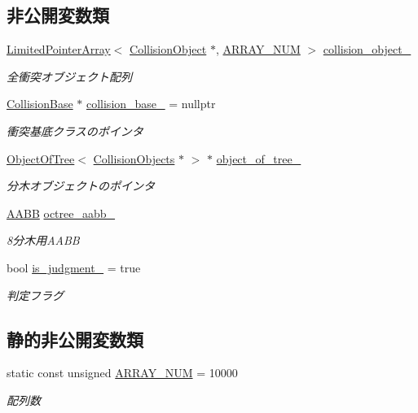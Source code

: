 \subsection*{非公開変数類}
\begin{DoxyCompactItemize}
\item 
\mbox{\hyperlink{class_limited_pointer_array}{Limited\+Pointer\+Array}}$<$ \mbox{\hyperlink{class_collision_object}{Collision\+Object}} $\ast$, \mbox{\hyperlink{class_collision_objects_a907cb151a9bbdd323eba56a4e4e1ee76}{A\+R\+R\+A\+Y\+\_\+\+N\+UM}} $>$ \mbox{\hyperlink{class_collision_objects_a35339b83828ab664fdcd51caca09cb79}{collision\+\_\+object\+\_\+}}
\begin{DoxyCompactList}\small\item\em 全衝突オブジェクト配列 \end{DoxyCompactList}\item 
\mbox{\hyperlink{class_collision_base}{Collision\+Base}} $\ast$ \mbox{\hyperlink{class_collision_objects_a03e2ef7152dac946f5bbf887d9e190b1}{collision\+\_\+base\+\_\+}} = nullptr
\begin{DoxyCompactList}\small\item\em 衝突基底クラスのポインタ \end{DoxyCompactList}\item 
\mbox{\hyperlink{class_object_of_tree}{Object\+Of\+Tree}}$<$ \mbox{\hyperlink{class_collision_objects}{Collision\+Objects}} $\ast$ $>$ $\ast$ \mbox{\hyperlink{class_collision_objects_a649c1aa07a6043611aa8f7394690250a}{object\+\_\+of\+\_\+tree\+\_\+}}
\begin{DoxyCompactList}\small\item\em 分木オブジェクトのポインタ \end{DoxyCompactList}\item 
\mbox{\hyperlink{class_a_a_b_b}{A\+A\+BB}} \mbox{\hyperlink{class_collision_objects_a611be393dff69dc143e729c4f3f37399}{octree\+\_\+aabb\+\_\+}}
\begin{DoxyCompactList}\small\item\em 8分木用\+A\+A\+BB \end{DoxyCompactList}\item 
bool \mbox{\hyperlink{class_collision_objects_a913a0ae61bcea2210e20c0cdc505b55b}{is\+\_\+judgment\+\_\+}} = true
\begin{DoxyCompactList}\small\item\em 判定フラグ \end{DoxyCompactList}\end{DoxyCompactItemize}
\subsection*{静的非公開変数類}
\begin{DoxyCompactItemize}
\item 
static const unsigned \mbox{\hyperlink{class_collision_objects_a907cb151a9bbdd323eba56a4e4e1ee76}{A\+R\+R\+A\+Y\+\_\+\+N\+UM}} = 10000
\begin{DoxyCompactList}\small\item\em 配列数 \end{DoxyCompactList}\end{DoxyCompactItemize}


